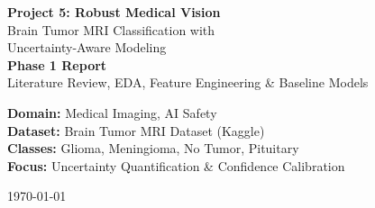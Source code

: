 \documentclass[12pt,a4paper]{article}
\begin{document}
\begin{titlepage}
\centering
\vspace*{2cm}
{\huge\bfseries\color{medblue} Project 5: Robust Medical Vision\\[0.5cm]}
{\Large Brain Tumor MRI Classification with\\Uncertainty-Aware Modeling\\[1.5cm]}
{\large\textbf{Phase 1 Report}\\
Literature Review, EDA, Feature Engineering \& Baseline Models\\[2cm]}

\begin{mdframed}[backgroundcolor=lightgray]
\centering
\textbf{Domain:} Medical Imaging, AI Safety\\
\textbf{Dataset:} Brain Tumor MRI Dataset (Kaggle)\\
\textbf{Classes:} Glioma, Meningioma, No Tumor, Pituitary\\
\textbf{Focus:} Uncertainty Quantification \& Confidence Calibration
\end{mdframed}

\vfill
{\large \today}
\end{titlepage}

\begin{abstract}
Medical AI systems deployed in clinical environments must not only be accurate — they must be trustworthy, particularly in knowing when to defer to human judgment. This report presents Phase 1 of Project 5: \textit{Robust Medical Vision}, which aims to build a brain tumor classification system with explicit uncertainty estimation. Using the Brain Tumor MRI Dataset from Kaggle (4 classes: glioma, meningioma, no tumor, pituitary), we conduct exploratory data analysis, engineer handcrafted visual features (HOG, LBP, GLCM), and train three classical machine learning classifiers augmented with probabilistic uncertainty measures. We evaluate not just accuracy, but \textit{calibration quality} (via Brier scores and reliability diagrams) and \textit{uncertainty decomposition} (via Shannon entropy and confidence thresholding). Our goal is a classifier that, when uncertain, flags cases for radiologist review rather than producing dangerous overconfident predictions.
\end{abstract}

\tableofcontents
\newpage

\end{document}
